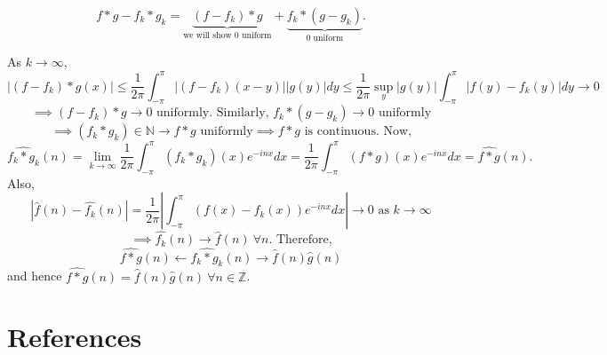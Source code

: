 \documentclass{functionspaces}
\begin{document}
\[
f*g-f_{k}*g_{k}=\underbrace{(f-f_{k})*g}_{\text{we will show $0$ uniform}}+\underbrace{f_{k}*(g-g_{k})}_{\text{$0$ uniform}}.
\]

As $k\to\infty$,
\[
|(f-f_{k})*g(x)|\leq\frac{1}{2\pi}\int_{-\pi}^{\pi}|(f-f_{k})(x-y)||g(y)|dy\leq\frac{1}{2\pi}\sup_{y}|g(y)|\int_{-\pi}^{\pi}|f(y)-f_{k}(y)|dy\to 0
\]
\[
\implies(f-f_{k})*g\to 0\text{ uniformly. Similarly, }f_{k}*(g-g_{k})\to 0\text{ uniformly}
\]
\[
\implies(f_{k}*g_{k})\in\mathbb{N}\to f*g\text{ uniformly}\implies f*g\text{ is continuous. Now,}
\]
\[
\widehat{f_{k}*g_{k}}(n)=\lim_{k\to\infty}\frac{1}{2\pi}\int_{-\pi}^{\pi}(f_{k}*g_{k})(x)e^{-inx}dx=\frac{1}{2\pi}\int_{-\pi}^{\pi}(f*g)(x)e^{-inx}dx=\widehat{f*g}(n).
\]
Also,
\[
|\hat{f}(n)-\hat{f_{k}}(n)|=\frac{1}{2\pi}\left|\int_{-\pi}^{\pi}(f(x)-f_{k}(x))e^{-inx}dx\right|\to 0\text{ as }k\to\infty
\]
\[
\implies\hat{f_{k}}(n)\to\hat{f}(n)\ \forall n.\text{ Therefore,}
\]
\[
\widehat{f*g}(n)\leftarrow\widehat{f_{k}*g_{k}}(n)\to\hat{f}(n)\hat{g}(n)
\]
and hence $\widehat{f*g}(n)=\hat{f}(n)\hat{g}(n)\ \forall n\in\mathbb{Z}$.

\setlength{\parindent}{0pt}
\endgroup






\newpage
\section{References}
\nocite{*} %
\printbibliography[heading=none]
\end{document}
